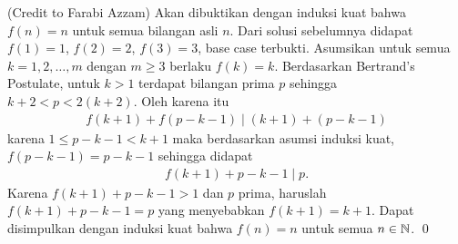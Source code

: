 \begin{solusi}[2] (Credit to Farabi Azzam)
    Akan dibuktikan dengan induksi kuat bahwa $f(n)=n$ untuk semua bilangan asli $n$. Dari solusi sebelumnya didapat $f(1)=1$, $f(2)=2$, $f(3)=3$, base case terbukti. Asumsikan untuk semua $k=1,2,\dots,m$ dengan $m \ge 3$ berlaku $f(k)=k$. Berdasarkan Bertrand's Postulate, untuk $k>1$ terdapat bilangan prima $p$ sehingga $k+2<p<2(k+2)$. Oleh karena itu
    \begin{align*}
        f(k+1)+f(p-k-1) \mid (k+1)+(p-k-1)
    \end{align*}
    karena $1\le p-k-1<k+1$ maka berdasarkan asumsi induksi kuat, $f(p-k-1)=p-k-1$ sehingga didapat
    \begin{align*}
        f(k+1)+p-k-1 \mid p.
    \end{align*}
    Karena $f(k+1)+p-k-1>1$ dan $p$ prima, haruslah $f(k+1)+p-k-1=p$ yang menyebabkan $f(k+1)=k+1$. Dapat disimpulkan dengan induksi kuat bahwa $f(n)=n$ untuk semua $n \in \mathbb N$. \qed
\end{solusi}